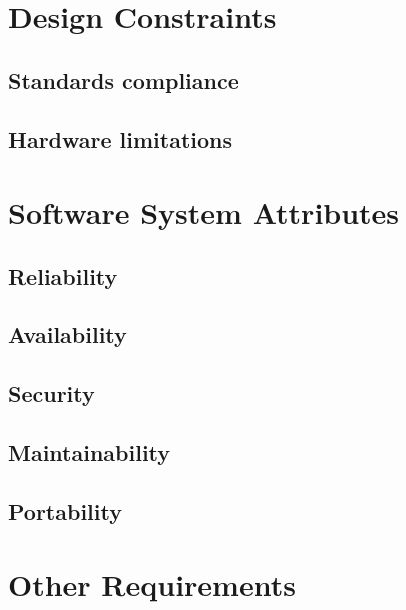 \documentclass[a4paper,12pt]{book}
\begin{document}
\section{Design Constraints}
\subsection{Standards compliance}
\subsection{Hardware limitations}

\section{Software System Attributes}
\subsection{Reliability}
\subsection{Availability}
\subsection{Security}
\subsection{Maintainability}
\subsection{Portability}

\section{Other Requirements}


\backmatter
\end{document}
